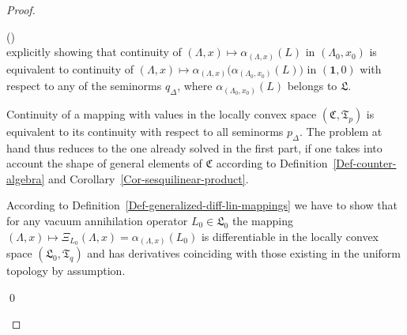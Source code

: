 \documentclass[11pt,twoside,openright]{report}
\theoremstyle{definition}
\theoremstyle{plain}
\theoremstyle{remark}
\theoremstyle{assumption}
\newcommand{\pD}{p_\Delta}
\newcommand{\qD}{q_\Delta}
\newcommand{\Cfrak}{\mathfrak{C}}
\newcommand{\Lfrak}{\mathfrak{L}}
\newcommand{\Tfrak}{\mathfrak{T}}
\newcommand{\unit}{\mathbf{1}}
\newcommand{\aLax}{\alpha_{( \Lambda , x )}}
\newcounter{proofitem}
\newenvironment{prooflist}{\begin{list}{(\roman{proofitem})}%
  {\usecounter{proofitem} \setlength{\topsep}{0ex}%
   \setlength{\parsep}{0.2ex} \setlength{\itemsep}{0.4ex}%
   \setlength{\leftmargin}{0em} \setlength{\itemindent}{0.5em}%
   \setlength{\listparindent}{1em}}}{\qed \end{list}}
\begin{document}
\begin{proof}
\begin{prooflist}
\begin{equation*}
    \end{equation*}
    explicitly showing that continuity of $( \Lambda , x ) \mapsto
    \aLax ( L )$ in $( \Lambda_0 , x_0 )$ is equivalent to continuity
    of $( \Lambda , x ) \mapsto \aLax \bigl( \alpha_{( \Lambda_0 , x_0
    )} ( L ) \bigr)$ in $( \unit , 0 )$ with respect to any of the
    seminorms $\qD$, where $\alpha_{( \Lambda_0 , x_0 )} ( L )$
    belongs to $\Lfrak$.
  \item Continuity of a mapping with values in the locally convex
    space $( \Cfrak , \Tfrak_p )$ is equivalent to its continuity with
    respect to all seminorms $\pD$. The problem at hand thus reduces
    to the one already solved in the first part, if one takes into
    account the shape of general elements of $\Cfrak$ according to
    Definition~\ref{Def-counter-algebra} and
    Corollary~\ref{Cor-sesquilinear-product}. 
  \item According to
    Definition~\ref{Def-generalized-diff-lin-mappings} we have to show
    that for any vacuum annihilation operator $L_0 \in \Lfrak_0$ the
    mapping $( \Lambda , x ) \mapsto \Xi_{L_0} ( \Lambda , x ) = \aLax
    ( L_0 )$ is differentiable in the locally convex space $( \Lfrak_0
    , \Tfrak_q )$ and has derivatives coinciding with those existing
    in the uniform topology by assumption.


\end{prooflist}
\end{proof}
\end{document}
